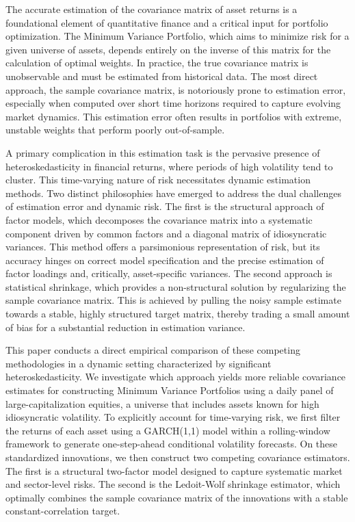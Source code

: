 \documentclass[]{article}
\begin{document}
The accurate estimation of the covariance matrix of asset returns is a foundational element of quantitative finance and a critical input for portfolio optimization. The Minimum Variance Portfolio, which aims to minimize risk for a given universe of assets, depends entirely on the inverse of this matrix for the calculation of optimal weights. In practice, the true covariance matrix is unobservable and must be estimated from historical data. The most direct approach, the sample covariance matrix, is notoriously prone to estimation error, especially when computed over short time horizons required to capture evolving market dynamics. This estimation error often results in portfolios with extreme, unstable weights that perform poorly out-of-sample.

A primary complication in this estimation task is the pervasive presence of heteroskedasticity in financial returns, where periods of high volatility tend to cluster. This time-varying nature of risk necessitates dynamic estimation methods. Two distinct philosophies have emerged to address the dual challenges of estimation error and dynamic risk. The first is the structural approach of factor models, which decomposes the covariance matrix into a systematic component driven by common factors and a diagonal matrix of idiosyncratic variances. This method offers a parsimonious representation of risk, but its accuracy hinges on correct model specification and the precise estimation of factor loadings and, critically, asset-specific variances. The second approach is statistical shrinkage, which provides a non-structural solution by regularizing the sample covariance matrix. This is achieved by pulling the noisy sample estimate towards a stable, highly structured target matrix, thereby trading a small amount of bias for a substantial reduction in estimation variance.

This paper conducts a direct empirical comparison of these competing methodologies in a dynamic setting characterized by significant heteroskedasticity. We investigate which approach yields more reliable covariance estimates for constructing Minimum Variance Portfolios using a daily panel of large-capitalization equities, a universe that includes assets known for high idiosyncratic volatility. To explicitly account for time-varying risk, we first filter the returns of each asset using a GARCH(1,1) model within a rolling-window framework to generate one-step-ahead conditional volatility forecasts. On these standardized innovations, we then construct two competing covariance estimators. The first is a structural two-factor model designed to capture systematic market and sector-level risks. The second is the Ledoit-Wolf shrinkage estimator, which optimally combines the sample covariance matrix of the innovations with a stable constant-correlation target.
\end{document}
